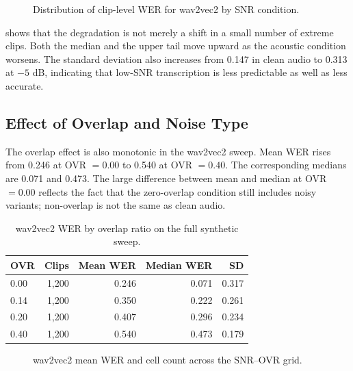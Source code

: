 \begin{figure}[htbp]
    \centering
    \caption{Distribution of clip-level WER for wav2vec2 by SNR condition.}
    \label{fig:stat_wav2vec2_snr_box}
\end{figure}

 shows that the degradation is not merely a shift in a small
number of extreme clips. Both the median and the upper tail move upward as the acoustic
condition worsens. The standard deviation also increases from 0.147 in clean audio to 0.313 at
\(-5\) dB, indicating that low-SNR transcription is less predictable as well as less accurate.

\subsection{Effect of Overlap and Noise Type}
The overlap effect is also monotonic in the wav2vec2 sweep. Mean WER rises from 0.246 at
OVR \(=0.00\) to 0.540 at OVR \(=0.40\). The corresponding medians are 0.071 and 0.473. The large
difference between mean and median at OVR \(=0.00\) reflects the fact that the zero-overlap
condition still includes noisy variants; non-overlap is not the same as clean audio.

\begin{table}[htbp]
\centering
\caption{wav2vec2 WER by overlap ratio on the full synthetic sweep.}
\label{tab:wav2vec2_ovr_summary}
\begin{tabular}{lrrrr}
\toprule
\textbf{OVR} & \textbf{Clips} & \textbf{Mean WER} & \textbf{Median WER} & \textbf{SD} \\
\midrule
0.00 & 1,200 & 0.246 & 0.071 & 0.317 \\
0.14 & 1,200 & 0.350 & 0.222 & 0.261 \\
0.20 & 1,200 & 0.407 & 0.296 & 0.234 \\
0.40 & 1,200 & 0.540 & 0.473 & 0.179 \\
\bottomrule
\end{tabular}
\end{table}

\begin{figure}[htbp]
    \centering
    \caption{wav2vec2 mean WER and cell count across the SNR--OVR grid.}
    \label{fig:stat_wav2vec2_heatmap}
\end{figure}

